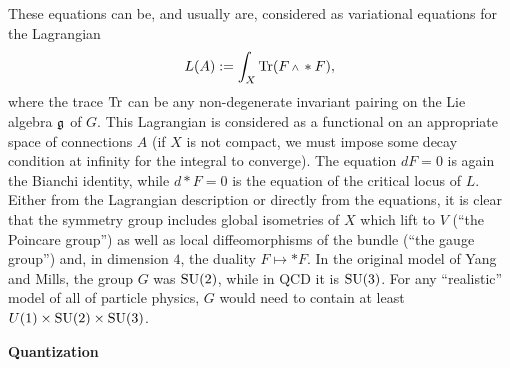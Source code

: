 These equations can be, and usually are, considered as
variational equations for the Lagrangian
$$
L(A):=\int_X \Tr(F\w *F),
$$
where the trace $\text{\rm Tr}$ can be any non-degenerate invariant 
pairing on the Lie algebra $\frak{g}$ of $G$.
This Lagrangian is considered as a functional on an
appropriate space of connections $A$ (if $X$ is not compact,
we must impose some decay condition at infinity for the
integral to converge).
The equation $dF=0$ is again the Bianchi identity, while
$d*F=0$ is the equation of the critical locus of $L$.
Either from the Lagrangian description or directly from the
equations, it is clear that the symmetry group includes
global isometries of $X$ which lift to $V$ (``the Poincare
group'') as well as local diffeomorphisms of the bundle
(``the gauge group'') and, in dimension $4$, the duality
$F\mapsto *F$.
In the original model of Yang and Mills, the group $G$ was
$\text{\rm SU}(2)$, while in QCD it is $\text{\rm SU}(3)$. 
For any ``realistic'' model of all of particle physics, $G$ would
need to contain at least $U(1)\times\text{\rm SU}(2)\times\text{\rm SU}(3)$.

\medskip\noindent
{\bf Quantization}


